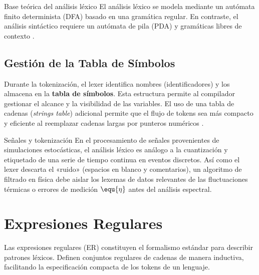 \begin{observacion}{Base teórica del análisis léxico}
  El análisis léxico se modela mediante un autómata finito determinista (DFA) basado en una gramática regular. En contraste, el análisis sintáctico requiere un autómata de pila (PDA) y gramáticas libres de contexto \cite{sipser2012introduction}.
\end{observacion}

\subsection{Gestión de la Tabla de Símbolos}

Durante la tokenización, el lexer identifica nombres (identificadores) y los almacena en la \textbf{tabla de símbolos}. Esta estructura permite al compilador gestionar el alcance y la visibilidad de las variables. El uso de una tabla de cadenas (\textit{strings table}) adicional permite que el flujo de tokens sea más compacto y eficiente al reemplazar cadenas largas por punteros numéricos \cite{aho2006compilers}.

\begin{fisicaconexion}{Señales y tokenización}
En el procesamiento de señales provenientes de simulaciones estocásticas, el análisis léxico es análogo a la cuantización y etiquetado de una serie de tiempo continua en eventos discretos. Así como el lexer descarta el «ruido» (espacios en blanco y comentarios), un algoritmo de filtrado en física debe aislar los lexemas de datos relevantes de las fluctuaciones térmicas o errores de medición $\equ{\eta}$ antes del análisis espectral.
\end{fisicaconexion}

\section{Expresiones Regulares}
\label{sec:2_2_expresiones_regulares}

Las expresiones regulares (ER) constituyen el formalismo estándar para describir patrones léxicos. Definen conjuntos regulares de cadenas de manera inductiva, facilitando la especificación compacta de los tokens de un lenguaje.

